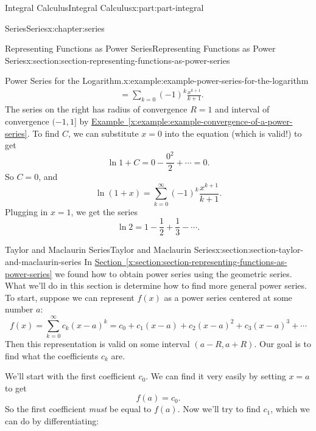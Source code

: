 \documentclass[twoside,10pt,]{book}
\newcommand{\xreffont}{\relax}
\numberwithin{equation}{part}
\newcommand{\amp}{&}
\begin{document}
\begin{partptx}{Integral Calculus}{}{Integral Calculus}{}{}{x:part:part-integral}
\begin{chapterptx}{Series}{}{Series}{}{}{x:chapter:series}
\begin{sectionptx}{Representing Functions as Power Series}{}{Representing Functions as Power Series}{}{}{x:section:section-representing-functions-as-power-series}
\begin{example}{Power Series for the Logarithm.}{x:example:example-power-series-for-the-logarithm}
\begin{align*}
\amp = \sum_{k=0} (-1)^{k} \frac{x^{k+1}}{k+1}\text{.}
\end{align*}
The series on the right has radius of convergence \(R = 1\) and interval of convergence \((-1, 1]\) by \hyperref[x:example:example-convergence-of-a-power-series]{Example~{\xreffont\ref{x:example:example-convergence-of-a-power-series}}}. To find \(C\), we can substitute \(x = 0\) into the equation (which is valid!) to get%
\begin{equation*}
\ln1 + C = 0 - \frac{0^{2}}{2} + \cdots = 0\text{.}
\end{equation*}
So \(C = 0\), and%
\begin{equation*}
\ln(1 + x) = \sum_{k=0}^{\infty}(-1)^{k}\frac{x^{k+1}}{k+1}\text{.}
\end{equation*}
Plugging in \(x = 1\), we get the series%
\begin{equation*}
\ln2 = 1 - \frac{1}{2} + \frac{1}{3} - \cdots\text{.}
\end{equation*}
%
\end{example}
\end{sectionptx}
%
%
\typeout{************************************************}
\typeout{************************************************}
%
\begin{sectionptx}{Taylor and Maclaurin Series}{}{Taylor and Maclaurin Series}{}{}{x:section:section-taylor-and-maclaurin-series}
In \hyperref[x:section:section-representing-functions-as-power-series]{Section~{\xreffont\ref{x:section:section-representing-functions-as-power-series}}} we found how to obtain power series using the geometric series. What we'll do in this section is determine how to find more general power series. To start, suppose we can represent \(f(x)\) as a power series centered at some number \(a\):%
\begin{equation*}
f(x) = \sum_{k=0}^{\infty}c_{k}(x - a)^{k} = c_{0} + c_{1}(x - a) + c_{2}(x - a)^{2} + c_{3}(x - a)^{3} + \cdots
\end{equation*}
Then this representation is valid on some interval \((a - R, a + R)\). Our goal is to find what the coefficients \(c_{k}\) are.%
\par
We'll start with the first coefficient \(c_{0}\). We can find it very easily by setting \(x = a\) to get%
\begin{equation*}
f(a) = c_{0}\text{.}
\end{equation*}
So the first coefficient \emph{must} be equal to \(f(a)\). Now we'll try to find \(c_{1}\), which we can do by differentiating:%

\end{sectionptx}
\end{chapterptx}
\end{partptx}
\end{document}
